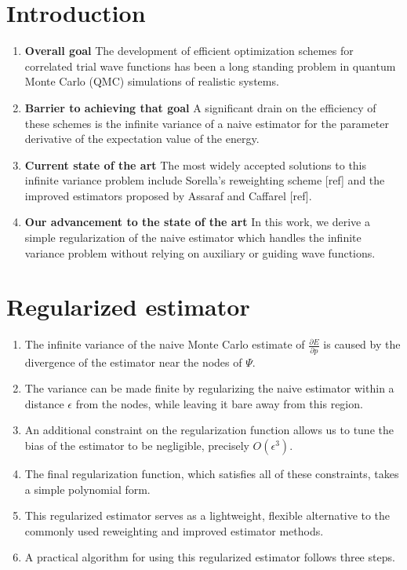 \documentclass{article}
\begin{document}
\section{Introduction}
\begin{enumerate}
\item \textbf{Overall goal } The development of efficient optimization schemes for correlated trial wave functions has been a long standing problem in quantum Monte Carlo (QMC) simulations of realistic systems.

\item \textbf{Barrier to achieving that goal } A significant drain on the efficiency of these schemes is the infinite variance of a naive estimator for the parameter derivative of the expectation value of the energy.

\item \textbf{Current state of the art} The most widely accepted solutions to this infinite variance problem include Sorella's reweighting scheme [ref] and the improved estimators proposed by Assaraf and Caffarel [ref].

\item \textbf{Our advancement to the state of the art } In this work, we derive a simple regularization of the naive estimator which handles the infinite variance problem without relying on auxiliary or guiding wave functions.
\end{enumerate}

\section{Regularized estimator}
\begin{enumerate}
\item The infinite variance of the naive Monte Carlo estimate of $\frac{\partial E}{\partial p}$ is caused by the divergence of the estimator near the nodes of $\Psi$.

\item The variance can be made finite by regularizing the naive estimator within a distance $\epsilon$ from the nodes, while leaving it bare away from this region.

\item An additional constraint on the regularization function allows us to tune the bias of the estimator to be negligible, precisely $O(\epsilon^3)$. 

\item The final regularization function, which satisfies all of these constraints, takes a simple polynomial form.

\item This regularized estimator serves as a lightweight, flexible alternative to the commonly used reweighting and improved estimator methods.

\item A practical algorithm for using this regularized estimator follows three steps. 
\end{enumerate}
\end{document}
